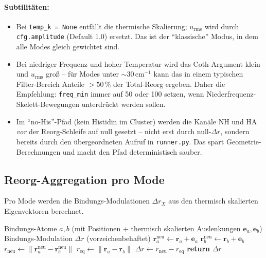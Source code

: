 \documentclass[11pt,a4paper,twoside]{article}
\theoremstyle{remark}
\begin{document}
\paragraph{Subtilit\"aten:}
\begin{itemize}\setlength{\itemsep}{0pt}
  \item Bei \texttt{temp\_k = None} entf\"allt die thermische Skalierung;
        $u_\text{rms}$ wird durch \texttt{cfg.amplitude} (Default 1.0)
        ersetzt. Das ist der "`klassische"' Modus, in dem alle Modes
        gleich gewichtet sind.
  \item Bei niedriger Frequenz und hoher Temperatur wird das
        Coth-Argument klein und $u_\text{rms}$ gro{\ss} -- f\"ur Modes
        unter $\sim 30\,$cm$^{-1}$ kann das in einem typischen
        Filter-Bereich Anteile $> 50\,\%$ der Total-Reorg ergeben.
        Daher die Empfehlung: \texttt{freq\_min} immer auf 50 oder 100
        setzen, wenn Niederfrequenz-Skelett-Bewegungen unterdr\"uckt
        werden sollen.
  \item Im "`no-His"'-Pfad (kein Histidin im Cluster) werden die
        Kan\"ale NH und HA \emph{vor} der Reorg-Schleife auf null
        gesetzt -- nicht erst durch null-$\Delta r$, sondern bereits
        durch den \"ubergeordneten Aufruf in \texttt{runner.py}.
        Das spart Geometrie-Berechnungen und macht den Pfad
        deterministisch sauber.
\end{itemize}

\subsection{Reorg-Aggregation pro Mode}
\label{app:pseudo-reorg}

Pro Mode werden die Bindungs-Modulationen $\Delta r_X$ aus den
thermisch skalierten Eigenvektoren berechnet.

\begin{algorithm}[H]
\caption{\textsc{ComputeBondModulation} (FeFe-Beispiel)}
\begin{algorithmic}[1]
\Require Bindungs-Atome $a, b$ (mit Positionen + thermisch skalierten
         Auslenkungen $\mathbf{e}_a, \mathbf{e}_b$)
\Ensure Bindungs-Modulation $\Delta r$ (vorzeichenbehaftet)
\State $\mathbf{r}_a^\text{neu} \gets \mathbf{r}_a + \mathbf{e}_a$
\State $\mathbf{r}_b^\text{neu} \gets \mathbf{r}_b + \mathbf{e}_b$
\State $r_\text{neu} \gets \|\mathbf{r}_a^\text{neu} - \mathbf{r}_b^\text{neu}\|$
\State $r_\text{eq} \gets \|\mathbf{r}_a - \mathbf{r}_b\|$
\State $\Delta r \gets r_\text{neu} - r_\text{eq}$
\State \textbf{return} $\Delta r$
\end{algorithmic}
\end{algorithm}
\end{document}
